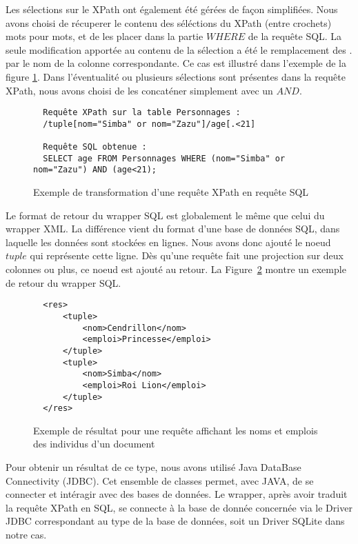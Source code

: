 \documentclass[a4paper,10pt]{article}
\newcommand{\fref}[1]{Figure~\ref{#1}}
\begin{document}
Les sélections sur le XPath ont également été gérées de façon simplifiées. Nous avons choisi de récuperer le contenu des séléctions du XPath (entre crochets) mots pour mots, et de les placer dans la partie \(WHERE\) de la requête SQL. La seule modification apportée au contenu de la sélection a été le remplacement des \(.\) par le nom de la colonne correspondante. Ce cas est illustré dans l'exemple de la figure \ref{ex:XPathToSql}. Dans l'éventualité ou plusieurs sélections sont présentes dans la requête XPath, nous avons choisi de les concaténer simplement avec un \(AND\).

\begin{figure}[ht!]
\begin{verbatim}
  Requête XPath sur la table Personnages :
  /tuple[nom="Simba" or nom="Zazu"]/age[.<21]
  
  Requête SQL obtenue :
  SELECT age FROM Personnages WHERE (nom="Simba" or nom="Zazu") AND (age<21);
\end{verbatim}
\caption{Exemple de transformation d'une requête XPath en requête SQL}
\label{ex:XPathToSql}
\end{figure}


Le format de retour du wrapper SQL est globalement le même que celui du wrapper XML. La différence vient du format d'une base de données SQL, dans laquelle les données sont stockées en lignes. Nous avons donc ajouté le noeud \(tuple\) qui représente cette ligne. Dès qu'une requête fait une projection sur deux colonnes ou plus, ce noeud est ajouté au retour. La \fref{lst:retourTuple} montre un exemple de retour du wrapper SQL.

\begin{figure}[ht!]
\begin{verbatim}
  <res>
      <tuple>
          <nom>Cendrillon</nom>
          <emploi>Princesse</emploi>
      </tuple>
      <tuple>
          <nom>Simba</nom>
          <emploi>Roi Lion</emploi>
      </tuple>
  </res>
\end{verbatim}
\caption{Exemple de résultat pour une requête affichant les noms et emplois des individus d'un document}
\label{lst:retourTuple}
\end{figure}

Pour obtenir un résultat de ce type, nous avons utilisé Java DataBase Connectivity (JDBC). Cet ensemble de classes permet, avec JAVA, de se connecter et intéragir avec des bases de données. Le wrapper, après avoir traduit la requête XPath en SQL, se connecte à la base de donnée concernée via le Driver JDBC correspondant au type de la base de données, soit un Driver SQLite dans notre cas.
\end{document}
